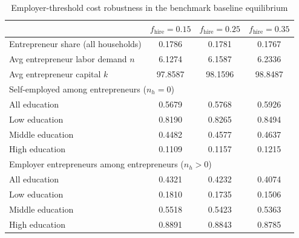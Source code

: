 \begin{table}[H]
\caption{Employer-threshold cost robustness in the benchmark baseline equilibrium}
\label{tab:self_employment_fhire_robustness_baseline}
\centering
\small
\begin{tabular}{|l|c|c|c|}
\hline
 & $f_{\mathrm{hire}}=0.15$ & $f_{\mathrm{hire}}=0.25$ & $f_{\mathrm{hire}}=0.35$ \\
\hline
Entrepreneur share (all households) & 0.1786 & 0.1781 & 0.1767 \\
\hline
Avg entrepreneur labor demand $n$ & 6.1274 & 6.1587 & 6.2336 \\
\hline
Avg entrepreneur capital $k$ & 97.8587 & 98.1596 & 98.8487 \\
\hline
\multicolumn{4}{|l|}{Self-employed among entrepreneurs ($n_h = 0$)} \\
\hline
All education & 0.5679 & 0.5768 & 0.5926 \\
\hline
Low education & 0.8190 & 0.8265 & 0.8494 \\
\hline
Middle education & 0.4482 & 0.4577 & 0.4637 \\
\hline
High education & 0.1109 & 0.1157 & 0.1215 \\
\hline
\multicolumn{4}{|l|}{Employer entrepreneurs among entrepreneurs ($n_h > 0$)} \\
\hline
All education & 0.4321 & 0.4232 & 0.4074 \\
\hline
Low education & 0.1810 & 0.1735 & 0.1506 \\
\hline
Middle education & 0.5518 & 0.5423 & 0.5363 \\
\hline
High education & 0.8891 & 0.8843 & 0.8785 \\
\hline
\end{tabular}
\end{table}

